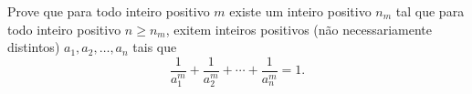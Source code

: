 Prove que para todo inteiro positivo $m$ existe um inteiro positivo $n_m$ tal que para todo inteiro positivo $n \ge n_m$, exitem inteiros positivos (não necessariamente distintos) $a_1, a_2, \dots, a_n$ tais que
\[ \frac{1}{a_1^m} + \frac{1}{a_2^m} + \cdots + \frac{1}{a_n^m} = 1. \]
